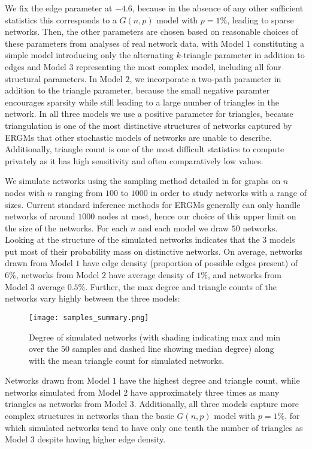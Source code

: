  	 We fix the edge parameter at $-4.6$, because in the absence of any other sufficient statistics this corresponds to a $G(n,p)$ model with $p = 1\%$, leading to sparse networks. Then, the other parameters are chosen based on reasonable choices of these parameters from analyses of real network data, with Model $1$ constituting a simple model introducing only the alternating $k$-triangle parameter in addition to edges and Model $3$ representing the most complex model, including all four structural parameters. In Model $2$, we incorporate a two-path parameter in addition to the triangle parameter, because the small negative paramter encourages sparsity while still leading to a large number of triangles in the network. In all three models we use a positive parameter for triangles, because triangulation is one of the most distinctive structures of networks captured by ERGMs that other stochastic models of networks are unable to describe. Additionally, triangle count is one of the most difficult statistics to compute privately as it has high sensitivity and often comparatively low values. 
 	 
 	We simulate networks using the sampling method detailed in  for graphs on $n$ nodes with $n$ ranging from $100$ to $1000$ in order to study networks with a range of sizes. Current standard inference methods for ERGMs generally can only handle networks of around $1000$ nodes at most, hence our choice of this upper limit on the size of the networks. For each $n$ and each model we draw $50$ networks. Looking at the structure of the simulated networks indicates that the $3$ models put most of their probability mass on distinctive networks. On average, networks drawn from Model $1$  have edge density (proportion of possible edges present) of $6\%$, networks from Model $2$ have average density of $1\%$, and networks from Model $3$ average $0.5\%$.  Further, the max degree and triangle counts of the networks vary highly between the three models:
 	
 	\begin{figure}[!h]
 		\centering
 		\texttt{[image: samples\_summary.png]}
 		\caption{Degree of simulated networks (with shading indicating max and min over the $50$ samples and dashed line showing median degree) along with the mean triangle count for simulated networks.}
 	\end{figure}
 
 	 Networks drawn from Model $1$ have the highest degree and triangle count, while networks simulated from Model $2$ have approximately three times as many triangles as networks from Model $3$. Additionally, all three models capture more complex structures in networks than the basic $G(n,p)$ model with $p = 1\%$, for which simulated networks tend to have only one tenth the number of triangles as Model $3$ despite having higher edge density.  
 	
